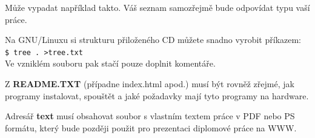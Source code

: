 \documentclass[11pt,twoside,a4paper]{book}
\begin{document}
Může vypadat například takto. Váš seznam samozřejmě bude odpovídat typu vaší práce.


Na GNU/Linuxu si strukturu přiloženého CD můžete snadno vyrobit příkazem:\\ 
\verb|$ tree . >tree.txt|\\
Ve vzniklém souboru pak stačí pouze doplnit komentáře.

Z \textbf{README.TXT} (případne index.html apod.)  musí být rovněž zřejmé, jak programy instalovat, spouštět a
jaké požadavky mají tyto programy na hardware.

Adresář \textbf{text}  musí obsahovat soubor s vlastním textem práce v PDF nebo PS formátu, který bude později
použit pro prezentaci diplomové práce na WWW.
\end{document}
